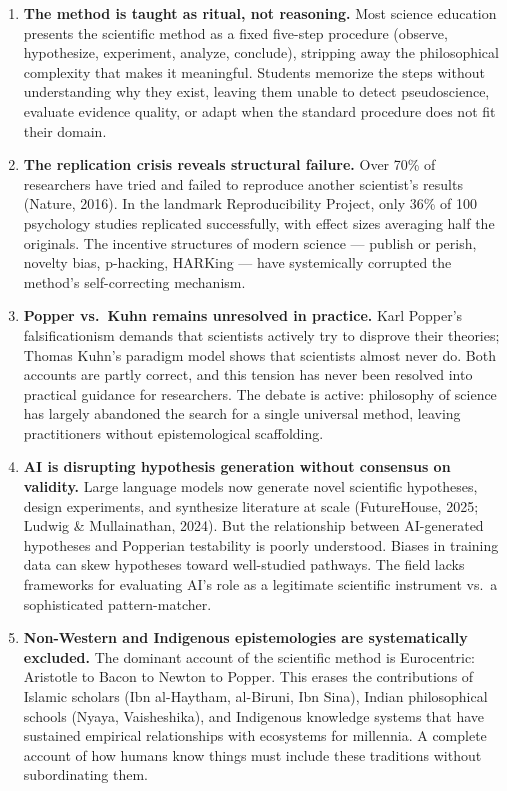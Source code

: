 \documentclass[11pt,letterpaper]{article}
\begin{document}
\begin{enumerate}
  \item \textbf{The method is taught as ritual, not reasoning.} Most science education presents the scientific method as a fixed five-step procedure (observe, hypothesize, experiment, analyze, conclude), stripping away the philosophical complexity that makes it meaningful. Students memorize the steps without understanding why they exist, leaving them unable to detect pseudoscience, evaluate evidence quality, or adapt when the standard procedure does not fit their domain.

  \item \textbf{The replication crisis reveals structural failure.} Over 70\% of researchers have tried and failed to reproduce another scientist's results (Nature, 2016). In the landmark Reproducibility Project, only 36\% of 100 psychology studies replicated successfully, with effect sizes averaging half the originals. The incentive structures of modern science --- publish or perish, novelty bias, p-hacking, HARKing --- have systemically corrupted the method's self-correcting mechanism.

  \item \textbf{Popper vs.\ Kuhn remains unresolved in practice.} Karl Popper's falsificationism demands that scientists actively try to disprove their theories; Thomas Kuhn's paradigm model shows that scientists almost never do. Both accounts are partly correct, and this tension has never been resolved into practical guidance for researchers. The debate is active: philosophy of science has largely abandoned the search for a single universal method, leaving practitioners without epistemological scaffolding.

  \item \textbf{AI is disrupting hypothesis generation without consensus on validity.} Large language models now generate novel scientific hypotheses, design experiments, and synthesize literature at scale (FutureHouse, 2025; Ludwig \& Mullainathan, 2024). But the relationship between AI-generated hypotheses and Popperian testability is poorly understood. Biases in training data can skew hypotheses toward well-studied pathways. The field lacks frameworks for evaluating AI's role as a legitimate scientific instrument vs.\ a sophisticated pattern-matcher.

  \item \textbf{Non-Western and Indigenous epistemologies are systematically excluded.} The dominant account of the scientific method is Eurocentric: Aristotle to Bacon to Newton to Popper. This erases the contributions of Islamic scholars (Ibn al-Haytham, al-Biruni, Ibn Sina), Indian philosophical schools (Nyaya, Vaisheshika), and Indigenous knowledge systems that have sustained empirical relationships with ecosystems for millennia. A complete account of how humans know things must include these traditions without subordinating them.
\end{enumerate}
\end{document}

